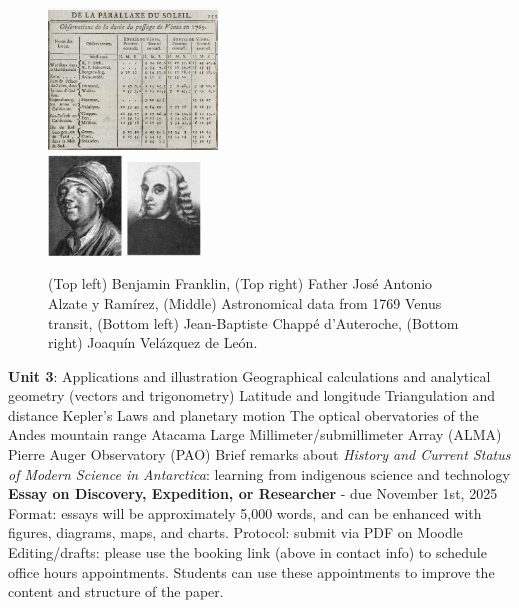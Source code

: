 \documentclass[10pt]{article}
\begin{document}
\begin{outline}[enumerate]
\begin{figure}[hb]
\includegraphics[width=0.40\textwidth]{figures/1769_transit.png} \\
\includegraphics[width=0.175\textwidth]{figures/Abbot_dAuteroche.png}
\includegraphics[width=0.175\textwidth]{figures/joaquin_v_d_Leon.png}
\caption{\label{fig:franklin} (Top left) Benjamin Franklin, (Top right) Father Jos\'{e} Antonio Alzate y Ram\'{i}rez, (Middle) Astronomical data from 1769 Venus transit, (Bottom left) Jean-Baptiste Chapp\'{e} d'Auteroche, (Bottom right) Joaqu\'{i}n Vel\'{a}zquez de Le\'{o}n.}
\end{figure}
\1 \textbf{Unit 3}: Applications and illustration
\2 Geographical calculations and analytical geometry (vectors and trigonometry)
\3 Latitude and longitude
\3 Triangulation and distance
\3 Kepler's Laws and planetary motion
\3 The optical obervatories of the Andes mountain range
\2 Atacama Large Millimeter/submillimeter Array (ALMA)
\2 Pierre Auger Observatory (PAO)
\2 Brief remarks about \textit{History and Current Status of Modern Science in Antarctica}: learning from indigenous science and technology
\1 \textbf{Essay on Discovery, Expedition, or Researcher} - due November 1st, 2025
\2 Format: essays will be approximately 5,000 words, and can be enhanced with figures, diagrams, maps, and charts.
\2 Protocol: submit via PDF on Moodle
\2 Editing/drafts: please use the booking link (above in contact info) to schedule office hours appointments.  Students can use these appointments to improve the content and structure of the paper.

\end{outline}
\end{document}
